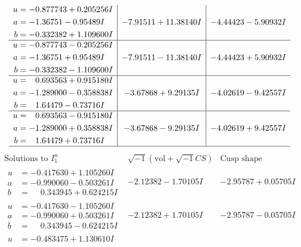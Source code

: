 \documentclass[1p]{elsarticle_modified}
\theoremstyle{definition}
\newcommand{\I}{\sqrt{-1}}
\begin{document}
$$\begin{array}{c|c|c}
\begin{aligned}
u &= -0.877743 + 0.205256 I \\
a &= -1.36751 - 0.95489 I \\
b &= -0.332382 + 1.109600 I\end{aligned}
 & -7.91511 + 11.38140 I & -4.44423 - 5.90932 I \\ \hline\begin{aligned}
u &= -0.877743 - 0.205256 I \\
a &= -1.36751 + 0.95489 I \\
b &= -0.332382 - 1.109600 I\end{aligned}
 & -7.91511 - 11.38140 I & -4.44423 + 5.90932 I \\ \hline\begin{aligned}
u &= \phantom{-}0.693563 + 0.915180 I \\
a &= -1.289000 - 0.358838 I \\
b &= \phantom{-}1.64479 - 0.73716 I\end{aligned}
 & -3.67868 + 9.29135 I & -4.02619 - 9.42557 I \\ \hline\begin{aligned}
u &= \phantom{-}0.693563 - 0.915180 I \\
a &= -1.289000 + 0.358838 I \\
b &= \phantom{-}1.64479 + 0.73716 I\end{aligned}
 & -3.67868 - 9.29135 I & -4.02619 + 9.42557 I\\
 \hline 
 \end{array}$$\newpage$$\begin{array}{c|c|c}  
\text{Solutions to }I^u_{1}& \I (\text{vol} + \sqrt{-1}CS) & \text{Cusp shape}\\
 \hline 
\begin{aligned}
u &= -0.417630 + 1.105260 I \\
a &= -0.990060 - 0.503261 I \\
b &= \phantom{-}0.343945 + 0.624215 I\end{aligned}
 & -2.12382 - 1.70105 I & -2.95787 + 0.05705 I \\ \hline\begin{aligned}
u &= -0.417630 - 1.105260 I \\
a &= -0.990060 + 0.503261 I \\
b &= \phantom{-}0.343945 - 0.624215 I\end{aligned}
 & -2.12382 + 1.70105 I & -2.95787 - 0.05705 I \\ \hline\begin{aligned}
u &= -0.483475 + 1.130610 I \\

\end{aligned}
\end{array}$$
\end{document}
